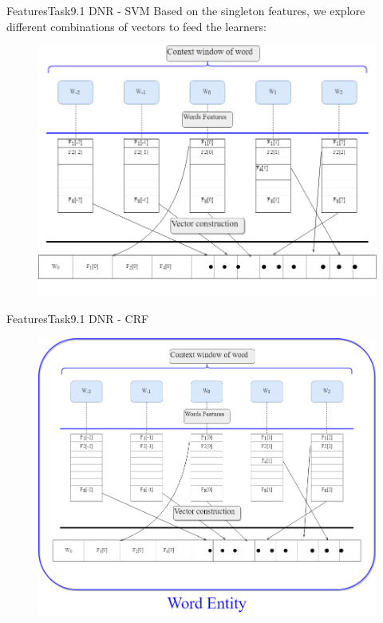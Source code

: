 \documentclass[xcolor=table]{beamer}
\begin{document}
\begin{frame}{Features}{Task9.1 DNR - SVM}
Based on the singleton features, we explore different combinations of vectors to feed the learners:
\begin{figure}
\includegraphics[scale=0.3]{VectorConstruction.png}
\end{figure}
\end{frame}





\begin{frame}{Features}{Task9.1 DNR - CRF}
\begin{figure}
\includegraphics[scale=0.25]{wordEntity.png}
\end{figure}
\end{frame}
\end{document}
